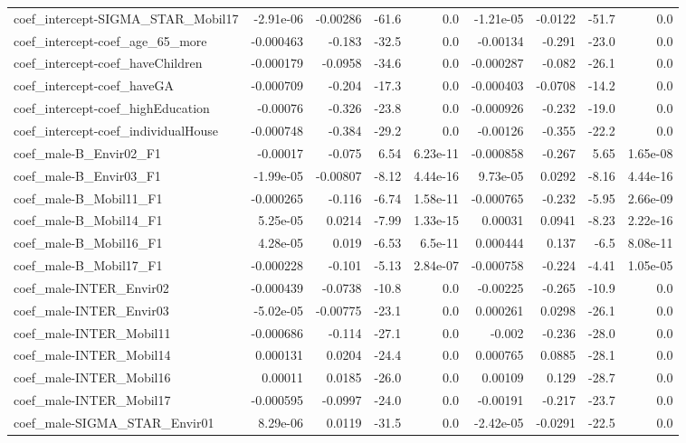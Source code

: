 \begin{tabular}{lrrrrrrrr}
coef_intercept-SIGMA_STAR_Mobil17 & -2.91e-06 & -0.00286 & -61.6 & 0.0 & -1.21e-05 & -0.0122 & -51.7 & 0.0 \\
coef_intercept-coef_age_65_more & -0.000463 & -0.183 & -32.5 & 0.0 & -0.00134 & -0.291 & -23.0 & 0.0 \\
coef_intercept-coef_haveChildren & -0.000179 & -0.0958 & -34.6 & 0.0 & -0.000287 & -0.082 & -26.1 & 0.0 \\
coef_intercept-coef_haveGA & -0.000709 & -0.204 & -17.3 & 0.0 & -0.000403 & -0.0708 & -14.2 & 0.0 \\
coef_intercept-coef_highEducation & -0.00076 & -0.326 & -23.8 & 0.0 & -0.000926 & -0.232 & -19.0 & 0.0 \\
coef_intercept-coef_individualHouse & -0.000748 & -0.384 & -29.2 & 0.0 & -0.00126 & -0.355 & -22.2 & 0.0 \\
coef_male-B_Envir02_F1 & -0.00017 & -0.075 & 6.54 & 6.23e-11 & -0.000858 & -0.267 & 5.65 & 1.65e-08 \\
coef_male-B_Envir03_F1 & -1.99e-05 & -0.00807 & -8.12 & 4.44e-16 & 9.73e-05 & 0.0292 & -8.16 & 4.44e-16 \\
coef_male-B_Mobil11_F1 & -0.000265 & -0.116 & -6.74 & 1.58e-11 & -0.000765 & -0.232 & -5.95 & 2.66e-09 \\
coef_male-B_Mobil14_F1 & 5.25e-05 & 0.0214 & -7.99 & 1.33e-15 & 0.00031 & 0.0941 & -8.23 & 2.22e-16 \\
coef_male-B_Mobil16_F1 & 4.28e-05 & 0.019 & -6.53 & 6.5e-11 & 0.000444 & 0.137 & -6.5 & 8.08e-11 \\
coef_male-B_Mobil17_F1 & -0.000228 & -0.101 & -5.13 & 2.84e-07 & -0.000758 & -0.224 & -4.41 & 1.05e-05 \\
coef_male-INTER_Envir02 & -0.000439 & -0.0738 & -10.8 & 0.0 & -0.00225 & -0.265 & -10.9 & 0.0 \\
coef_male-INTER_Envir03 & -5.02e-05 & -0.00775 & -23.1 & 0.0 & 0.000261 & 0.0298 & -26.1 & 0.0 \\
coef_male-INTER_Mobil11 & -0.000686 & -0.114 & -27.1 & 0.0 & -0.002 & -0.236 & -28.0 & 0.0 \\
coef_male-INTER_Mobil14 & 0.000131 & 0.0204 & -24.4 & 0.0 & 0.000765 & 0.0885 & -28.1 & 0.0 \\
coef_male-INTER_Mobil16 & 0.00011 & 0.0185 & -26.0 & 0.0 & 0.00109 & 0.129 & -28.7 & 0.0 \\
coef_male-INTER_Mobil17 & -0.000595 & -0.0997 & -24.0 & 0.0 & -0.00191 & -0.217 & -23.7 & 0.0 \\
coef_male-SIGMA_STAR_Envir01 & 8.29e-06 & 0.0119 & -31.5 & 0.0 & -2.42e-05 & -0.0291 & -22.5 & 0.0 \\

\end{tabular}

